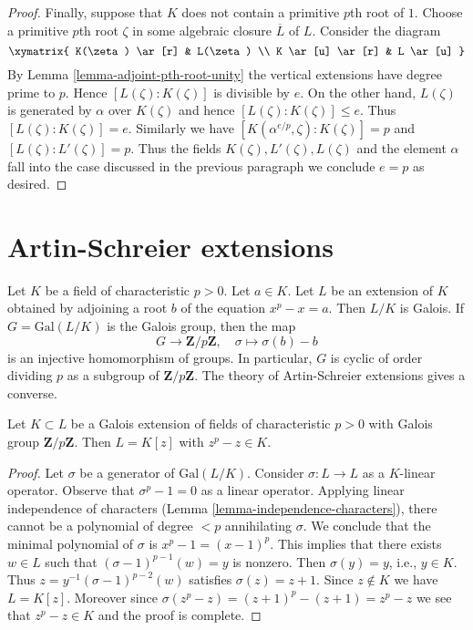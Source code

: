\begin{proof}
\medskip\noindent
Finally, suppose that $K$ does not contain a primitive
$p$th root of $1$.
Choose a primitive $p$th root $\zeta$ in some algebraic closure
$\overline{L}$ of $L$. Consider the diagram
$$
\xymatrix{
K(\zeta) \ar[r] & L(\zeta) \\
K \ar[u] \ar[r] & L \ar[u]
}
$$
By Lemma \ref{lemma-adjoint-pth-root-unity}
the vertical extensions have degree prime to $p$.
Hence $[L(\zeta) : K(\zeta)]$ is divisible by $e$.
On the other hand, $L(\zeta)$ is generated by $\alpha$
over $K(\zeta)$ and hence $[L(\zeta) : K(\zeta)] \leq e$.
Thus $[L(\zeta) : K(\zeta)] = e$. Similarly we have
$[K(\alpha^{e/p}, \zeta) : K(\zeta)] = p$ and
$[L(\zeta) : L'(\zeta)] = p$. Thus the fields
$K(\zeta), L'(\zeta), L(\zeta)$ and the element $\alpha$
fall into the case discussed
in the previous paragraph we conclude $e = p$ as desired.
\end{proof}




\section{Artin-Schreier extensions}
\label{section-Artin-Schreier}

\noindent
Let $K$ be a field of characteristic $p > 0$. Let $a \in K$. Let $L$ be an
extension of $K$ obtained by adjoining a root $b$ of the equation
$x^p - x = a$. Then $L/K$ is Galois. If $G = \text{Gal}(L/K)$ is the Galois
group, then the map
$$
G \longrightarrow \mathbf{Z}/p\mathbf{Z},\quad
\sigma \longmapsto \sigma(b) - b
$$
is an injective homomorphism of groups. In particular, $G$ is cyclic
of order dividing $p$ as a subgroup of $\mathbf{Z}/p\mathbf{Z}$.
The theory of Artin-Schreier extensions gives a converse.

\begin{lemma}
\label{lemma-Artin-Schreier}
Let $K \subset L$ be a Galois extension of fields of characteristic $p > 0$
with Galois group $\mathbf{Z}/p\mathbf{Z}$. Then $L = K[z]$ with
$z^p - z \in K$.
\end{lemma}

\begin{proof}
Let $\sigma$ be a generator of $\text{Gal}(L/K)$.
Consider $\sigma : L \to L$ as a $K$-linear operator.
Observe that $\sigma^p - 1 = 0$ as a linear operator.
Applying linear independence of characters
(Lemma \ref{lemma-independence-characters}),
there cannot be a polynomial of degree $< p$
annihilating $\sigma$. We conclude that the minimal
polynomial of $\sigma$ is $x^p - 1 = (x - 1)^p$.
This implies that there exists $w \in L$ such that
$(\sigma - 1)^{p - 1}(w) = y$ is nonzero. Then
$\sigma(y) = y$, i.e., $y \in K$. Thus
$z = y^{-1}(\sigma - 1)^{p - 2}(w)$ satisfies
$\sigma(z) = z + 1$. Since $z \not \in K$ we have $L = K[z]$.
Moreover since $\sigma(z^p - z) = (z + 1)^p - (z + 1) = z^p - z$
we see that $z^p - z \in K$ and the proof is complete.
\end{proof}







